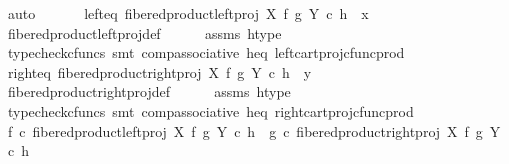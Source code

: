 \begin{isabellebody}
\ auto\isanewline
\ \ \isanewline
\ \ \isamarkupfalse%
\ left{\isacharunderscore}{\kern0pt}eq{\isacharcolon}{\kern0pt}\ {\isachardoublequoteopen}fibered{\isacharunderscore}{\kern0pt}product{\isacharunderscore}{\kern0pt}left{\isacharunderscore}{\kern0pt}proj\ X\ f\ g\ Y\ {\isasymcirc}\isactrlsub c\ h\ {\isacharequal}{\kern0pt}\ x{\isachardoublequoteclose}\isanewline
\ \ \ \ \isamarkupfalse%
\ fibered{\isacharunderscore}{\kern0pt}product{\isacharunderscore}{\kern0pt}left{\isacharunderscore}{\kern0pt}proj{\isacharunderscore}{\kern0pt}def\isanewline
\ \ \ \ \isamarkupfalse%
\ assms\ h{\isacharunderscore}{\kern0pt}type\isanewline
\ \ \ \ \isamarkupfalse%
\ {\isacharparenleft}{\kern0pt}typecheck{\isacharunderscore}{\kern0pt}cfuncs{\isacharcomma}{\kern0pt}\ smt\ comp{\isacharunderscore}{\kern0pt}associative{}\ h{\isacharunderscore}{\kern0pt}eq\ left{\isacharunderscore}{\kern0pt}cart{\isacharunderscore}{\kern0pt}proj{\isacharunderscore}{\kern0pt}cfunc{\isacharunderscore}{\kern0pt}prod{\isacharparenright}{\kern0pt}\isanewline
\isanewline
\ \ \isamarkupfalse%
\ right{\isacharunderscore}{\kern0pt}eq{\isacharcolon}{\kern0pt}\ {\isachardoublequoteopen}fibered{\isacharunderscore}{\kern0pt}product{\isacharunderscore}{\kern0pt}right{\isacharunderscore}{\kern0pt}proj\ X\ f\ g\ Y\ {\isasymcirc}\isactrlsub c\ h\ {\isacharequal}{\kern0pt}\ y{\isachardoublequoteclose}\isanewline
\ \ \ \ \isamarkupfalse%
\ fibered{\isacharunderscore}{\kern0pt}product{\isacharunderscore}{\kern0pt}right{\isacharunderscore}{\kern0pt}proj{\isacharunderscore}{\kern0pt}def\isanewline
\ \ \ \ \isamarkupfalse%
\ assms\ h{\isacharunderscore}{\kern0pt}type\isanewline
\ \ \ \ \isamarkupfalse%
\ {\isacharparenleft}{\kern0pt}typecheck{\isacharunderscore}{\kern0pt}cfuncs{\isacharcomma}{\kern0pt}\ smt\ comp{\isacharunderscore}{\kern0pt}associative{}\ h{\isacharunderscore}{\kern0pt}eq\ right{\isacharunderscore}{\kern0pt}cart{\isacharunderscore}{\kern0pt}proj{\isacharunderscore}{\kern0pt}cfunc{\isacharunderscore}{\kern0pt}prod{\isacharparenright}{\kern0pt}\isanewline
\isanewline
\ \ \isamarkupfalse%
\ {\isachardoublequoteopen}f\ {\isasymcirc}\isactrlsub c\ fibered{\isacharunderscore}{\kern0pt}product{\isacharunderscore}{\kern0pt}left{\isacharunderscore}{\kern0pt}proj\ X\ f\ g\ Y\ {\isasymcirc}\isactrlsub c\ h\ {\isacharequal}{\kern0pt}\ g\ {\isasymcirc}\isactrlsub c\ fibered{\isacharunderscore}{\kern0pt}product{\isacharunderscore}{\kern0pt}right{\isacharunderscore}{\kern0pt}proj\ X\ f\ g\ Y\ {\isasymcirc}\isactrlsub c\ h{\isachardoublequoteclose}\isanewline

\end{isabellebody}
